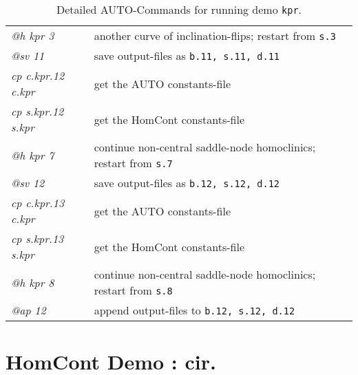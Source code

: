 \documentclass[12pt]{report}
\begin{document}
\begin{table}[htbp]
\begin{center}
\begin{tabular}{| l | l |}
  {\it @h kpr 3} & another curve of inclination-flips; restart from {\tt s.3} \\ 
  {\it @sv 11} & save output-files as {\tt b.11, s.11, d.11} \\ 
\hline
  {\it cp c.kpr.12 c.kpr} & get the AUTO constants-file \\ 
  {\it cp s.kpr.12 s.kpr} & get the HomCont constants-file \\ 
  {\it @h kpr 7} & continue non-central saddle-node homoclinics; restart from {\tt s.7} \\ 
  {\it @sv 12} & save output-files as {\tt b.12, s.12, d.12} \\ 
\hline
  {\it cp c.kpr.13 c.kpr} & get the AUTO constants-file \\ 
  {\it cp s.kpr.13 s.kpr} & get the HomCont constants-file \\ 
  {\it @h kpr 8} & continue non-central saddle-node homoclinics; restart from {\tt s.8} \\ 
  {\it @ap 12} & append output-files to {\tt b.12, s.12, d.12} \\ 
\hline
\end{tabular}
\caption{Detailed {\cal AUTO}-Commands for running demo {\tt kpr}.}
\label{tbl:demo_kpr_2}
\end{center}
\end{table}



\chapter{ {\cal HomCont} Demo : cir.} \label{ch:HomCont_cir}

\end{document}
